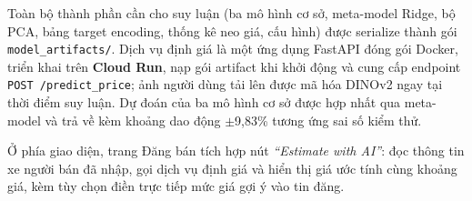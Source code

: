 Toàn bộ thành phần cần cho suy luận (ba mô hình cơ sở, meta-model Ridge, bộ PCA, bảng target encoding, thống kê neo giá, cấu hình) được serialize thành gói \texttt{model\_artifacts/}. Dịch vụ định giá là một ứng dụng FastAPI đóng gói Docker, triển khai trên \textbf{Cloud Run}, nạp gói artifact khi khởi động và cung cấp endpoint \texttt{POST /predict\_price}; ảnh người dùng tải lên được mã hóa DINOv2 ngay tại thời điểm suy luận. Dự đoán của ba mô hình cơ sở được hợp nhất qua meta-model và trả về kèm khoảng dao động $\pm$9{,}83\% tương ứng sai số kiểm thử.

Ở phía giao diện, trang Đăng bán tích hợp nút \textit{``Estimate with AI''}: đọc thông tin xe người bán đã nhập, gọi dịch vụ định giá và hiển thị giá ước tính cùng khoảng giá, kèm tùy chọn điền trực tiếp mức giá gợi ý vào tin đăng.
